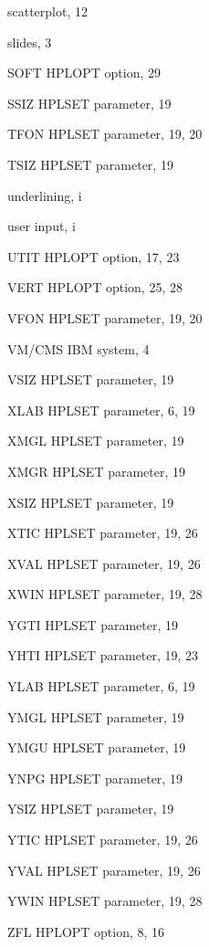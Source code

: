 \begin{theindex}
  \indexspace
 
  \item scatterplot, 12
  \item slides, 3
  \item SOFT
    \subitem HPLOPT option, 29
  \item SSIZ
    \subitem HPLSET parameter, 19
 
  \indexspace
 
  \item TFON
    \subitem HPLSET parameter, 19, 20
  \item TSIZ
    \subitem HPLSET parameter, 19
 
  \indexspace
 
  \item underlining, i
  \item user input, i
  \item UTIT
    \subitem HPLOPT option, 17, 23
 
  \indexspace
 
  \item VERT
    \subitem HPLOPT option, 25, 28
  \item VFON
    \subitem HPLSET parameter, 19, 20
  \item VM/CMS
    \subitem IBM system, 4
  \item VSIZ
    \subitem HPLSET parameter, 19
 
  \indexspace
 
  \item XLAB
    \subitem HPLSET parameter, 6, 19
  \item XMGL
    \subitem HPLSET parameter, 19
  \item XMGR
    \subitem HPLSET parameter, 19
  \item XSIZ
    \subitem HPLSET parameter, 19
  \item XTIC
    \subitem HPLSET parameter, 19, 26
  \item XVAL
    \subitem HPLSET parameter, 19, 26
  \item XWIN
    \subitem HPLSET parameter, 19, 28
 
  \indexspace
 
  \item YGTI
    \subitem HPLSET parameter, 19
  \item YHTI
    \subitem HPLSET parameter, 19, 23
  \item YLAB
    \subitem HPLSET parameter, 6, 19
  \item YMGL
    \subitem HPLSET parameter, 19
  \item YMGU
    \subitem HPLSET parameter, 19
  \item YNPG
    \subitem HPLSET parameter, 19
  \item YSIZ
    \subitem HPLSET parameter, 19
  \item YTIC
    \subitem HPLSET parameter, 19, 26
  \item YVAL
    \subitem HPLSET parameter, 19, 26
  \item YWIN
    \subitem HPLSET parameter, 19, 28
 
  \indexspace
 
  \item ZFL
    \subitem HPLOPT option, 8, 16
 
\end{theindex}
